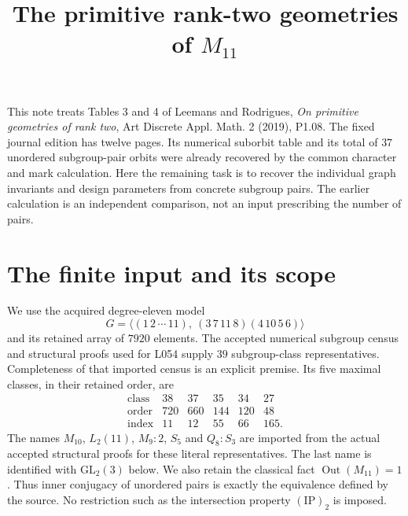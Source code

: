 \documentclass[11pt]{article}
\title{The primitive rank-two geometries of $M_{11}$}
\author{}\date{}
\begin{document}
\maketitle
This note treats Tables 3 and 4 of Leemans and Rodrigues,
\emph{On primitive geometries of rank two}, Art Discrete Appl. Math.
2 (2019), P1.08. The fixed journal edition has twelve pages. Its numerical
suborbit table and its total of $37$ unordered subgroup-pair orbits were
already recovered by the common character and mark calculation. Here the
remaining task is to recover the individual graph invariants and design
parameters from concrete subgroup pairs. The earlier calculation is an
independent comparison, not an input prescribing the number of pairs.

\section{The finite input and its scope}
We use the acquired degree-eleven model
\[
 G=\langle(1\,2\,\cdots\,11),\ (3\,7\,11\,8)(4\,10\,5\,6)\rangle
\]
and its retained array of $7920$ elements. The accepted numerical subgroup
census and structural proofs used for L054 supply $39$ subgroup-class
representatives. Completeness of that imported census is an explicit
premise. Its five maximal classes, in their retained order, are
\[
\begin{array}{c|rrrrr}
\text{class}&38&37&35&34&27\\
\text{order}&720&660&144&120&48\\
\text{index}&11&12&55&66&165.
\end{array}
\]
The names $M_{10}$, $L_2(11)$, $M_9:2$, $S_5$ and $Q_8:S_3$ are imported
from the actual accepted structural proofs for these literal representatives.
The last name is identified with $\mathrm{GL}_2(3)$ below. We also retain
the classical fact $\operatorname{Out}(M_{11})=1$. Thus inner conjugacy
of unordered pairs is exactly the equivalence defined by the source.
No restriction such as the intersection property $(\mathrm{IP})_2$ is imposed.
\end{document}
